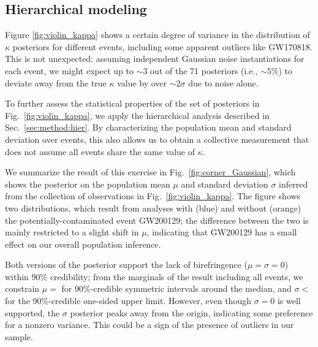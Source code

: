 \documentclass[aps,prd,twocolumn,superscriptaddress,preprintnumbers,floatfix,nofootinbib]{revtex4-2}
\begin{document}
\subsection{Hierarchical modeling}
\label{sec:results:hier}

Figure \ref{fig:violin_kappa} shows a certain degree of variance in the distribution of $\kappa$ posteriors for different events, including some apparent outliers like GW170818.
This is not unexpected: assuming independent Gaussian noise instantiations for each event, we might expect up to ${\sim}3$ out of the 71 posteriors (i.e., ${\sim}5\%$) to deviate away from the true $\kappa$ value by over ${\sim}2\sigma$ due to noise alone.

To further assess the statistical properties of the set of posteriors in Fig.~\ref{fig:violin_kappa}, we apply the hierarchical analysis described in Sec.~\ref{sec:method:hier}.
By characterizing the population mean and standard deviation over events, this also allows us to obtain a collective measurement that does not assume all events share the same value of $\kappa$.

We summarize the result of this exercise in Fig.~\ref{fig:corner_Gaussian}, which shows the posterior on the population mean $\mu$ and standard deviation $\sigma$ inferred from the collection of observations in Fig.~\ref{fig:violin_kappa}.
The figure shows two distributions, which result from analyses with (blue) and without (orange) the potentially-contaminated event GW200129; the difference between the two is mainly restricted to a slight shift in $\mu$, indicating that GW200129 has a small effect on our overall population inference.

Both versions of the posterior support the lack of birefringence ($\mu = \sigma = 0$) within 90\% credibility; from the marginals of the result including all events, we constrain $\mu =$  for 90\%-credible symmetric intervals around the median, and $\sigma <$  for the 90\%-credible one-sided upper limit.
However, even though $\sigma = 0$ is well supported, the $\sigma$ posterior peaks away from the origin, indicating some preference for a nonzero variance.
This could be a sign of the presence of outliers in our sample.
\end{document}
